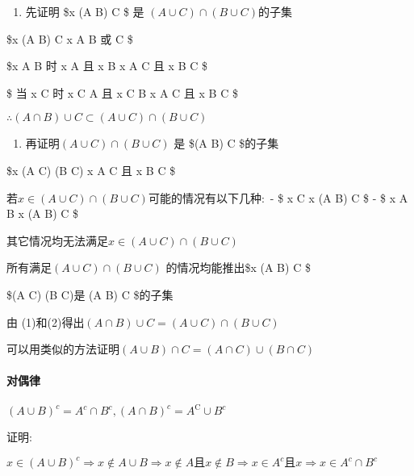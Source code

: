 \documentclass[11pt]{article}
\providecommand{\tightlist}{%
      \setlength{\itemsep}{0pt}\setlength{\parskip}{0pt}}
\begin{document}
\begin{enumerate}
\def\labelenumi{(\arabic{enumi})}
\tightlist
\item
  先证明 \$x \in(A \cap B) \cup C \$ 是
  \((A \cup C) \cap(B \cup C)\)的子集
\end{enumerate}

\$x \in(A \cap B) \cup C \Rightarrow x \in  A \cap B 或 C \$

\$\because x \in A \cap B 时 \Rightarrow x \in A 且 x \in B
\Rightarrow x \in A \cup C 且 x \in B \cup C \$

\$ 当 x \in C 时 \Rightarrow x \in C \cup A 且 x \in C \cup B
\Rightarrow x \in A \cup C 且 x \in B \cup C \$

\(\therefore (A \cap B) \cup C \subset (A \cup C) \cap(B \cup C)\)

\begin{enumerate}
\def\labelenumi{(\arabic{enumi})}
\setcounter{enumi}{1}
\tightlist
\item
  再证明\((A \cup C) \cap(B \cup C)\) 是 \$(A \cap B) \cup C \$的子集
\end{enumerate}

\$x \in(A \cup C) \cap(B \cup C) \Rightarrow x \in  A \cup C 且 x \in B
\cup C \$

\(若 x \in(A \cup C) \cap(B \cup C) 可能的情况有以下几种:\) - \$ x \in C
\Rightarrow x \in (A \cap B) \cup C \$ - \$ x \in A \cap B \Rightarrow x
\in (A \cap B) \cup C \$

其它情况均无法满足\(x \in(A \cup C) \cap(B \cup C)\)

所有满足\((A \cup C) \cap(B \cup C)\) 的情况均能推出\$x \in (A \cap B)
\cup C \$

\$\therefore (A \cup C) \cap(B \cup C)是 (A \cap B) \cup C \$的子集

由 (1)和(2)得出\((A \cap B) \cup C=(A \cup C) \cap(B \cup C)\)

可以用类似的方法证明\((A \cup B) \cap C=(A \cap C) \cup(B \cap C)\)

\paragraph{对偶律}\label{ux5bf9ux5076ux5f8b}

\((A \cup B)^{c}=A^{c} \cap B^{c}, (A \cap B)^{c}=A^{\mathrm{C}} \cup B^{c}\)

证明:

\(x \in(A \cup B)^{c} \Rightarrow x \notin A \cup B \Rightarrow x \notin A 且 x \notin B \Rightarrow x \in A^{c} 且 x \Rightarrow x \in A^{c} \cap B^{c}\)
\end{document}
